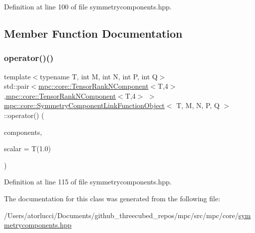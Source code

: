 Definition at line 100 of file symmetrycomponents.\+hpp.



\subsection{Member Function Documentation}
\mbox{\label{structmpc_1_1core_1_1_symmetry_component_link_function_object_a835c4bb7146d3c316e218b2dca519261}} 
\subsubsection{\texorpdfstring{operator()()}{operator()()}}
{\footnotesize\ttfamily template$<$typename T, int M, int N, int P, int Q$>$ \\
std\+::pair$<$\mbox{\hyperlink{classmpc_1_1core_1_1_tensor_rank_n_component}{mpc\+::core\+::\+Tensor\+Rank\+N\+Component}}$<$T,4$>$,\mbox{\hyperlink{classmpc_1_1core_1_1_tensor_rank_n_component}{mpc\+::core\+::\+Tensor\+Rank\+N\+Component}}$<$T,4$>$ $>$ \mbox{\hyperlink{structmpc_1_1core_1_1_symmetry_component_link_function_object}{mpc\+::core\+::\+Symmetry\+Component\+Link\+Function\+Object}}$<$ T, M, N, P, Q $>$\+::operator() (\begin{DoxyParamCaption}\item[{std\+::set$<$ \mbox{\hyperlink{classmpc_1_1core_1_1_tensor_rank_n_component}{mpc\+::core\+::\+Tensor\+Rank\+N\+Component}}$<$ T, 4 $>$ $>$ \&}]{components,  }\item[{T}]{scalar = {\ttfamily T(1.0)} }\end{DoxyParamCaption})\hspace{0.3cm}{\ttfamily [inline]}}



Definition at line 115 of file symmetrycomponents.\+hpp.



The documentation for this class was generated from the following file\+:\begin{DoxyCompactItemize}
\item 
/\+Users/atorlucci/\+Documents/github\+\_\+threecubed\+\_\+repos/mpc/src/mpc/core/\mbox{\hyperlink{symmetrycomponents_8hpp}{symmetrycomponents.\+hpp}}\end{DoxyCompactItemize}

